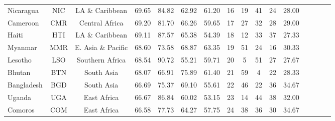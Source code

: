 \begin{singlespace}
{\begin{longtable}[H]{lccccccccccccccc}
Nicaragua                         & NIC           & LA \& Caribbean    & 69.65       & 84.82            & 62.92                     & 61.20           & 16             & 19                  & 41                           & 24                 & 28.00                  \\
Cameroon                          & CMR           & Central Africa     & 69.20       & 81.70            & 66.26                     & 59.65           & 17             & 27                  & 32                           & 28                 & 29.00                  \\
Haiti                             & HTI           & LA \& Caribbean    & 69.11       & 87.57            & 65.38                     & 54.39           & 18             & 12                  & 33                           & 37                 & 27.33                  \\
Myanmar                           & MMR           & E. Asia \& Pacific & 68.60       & 73.58            & 68.87                     & 63.35           & 19             & 51                  & 24                           & 16                 & 30.33                  \\
Lesotho                           & LSO           & Southern Africa    & 68.54       & 90.72            & 55.21                     & 59.71           & 20             & 5                   & 51                           & 27                 & 27.67                  \\
Bhutan                            & BTN           & South Asia         & 68.07       & 66.91            & 75.89                     & 61.40           & 21             & 59                  & 4                            & 22                 & 28.33                  \\
Bangladesh                        & BGD           & South Asia         & 66.69       & 75.37            & 69.10                     & 55.61           & 22             & 46                  & 22                           & 36                 & 34.67                  \\
Uganda                            & UGA           & East Africa        & 66.67       & 86.84            & 60.02                     & 53.15           & 23             & 14                  & 44                           & 38                 & 32.00                  \\
Comoros                           & COM           & East Africa        & 66.58       & 77.73            & 64.27                     & 57.75           & 24             & 38                  & 36                           & 30                 & 34.67                  \\

\end{longtable}}
\end{singlespace}
